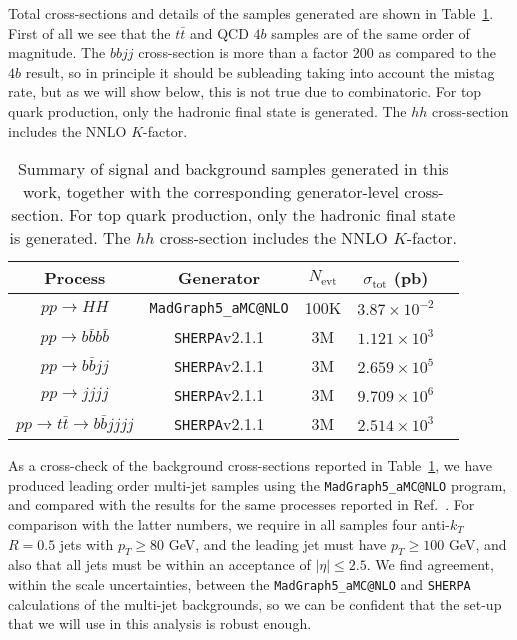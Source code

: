 Total cross-sections and details of the samples generated are shown in Table~\ref{tab:samples}.
%
First of all we see that the $t\bar{t}$ and QCD $4b$ samples are of
the same order of magnitude.
%
The $bbjj$ cross-section is more than a factor 200 as compared to the
$4b$ result, so in principle it should be subleading taking into
account the mistag rate, but as we will show below,
this is not true due to combinatoric.
%
 For top quark production, only the hadronic final state is generated.
The $hh$ cross-section includes the NNLO $K$-factor.


\begin{table}[h]
\begin{center}
\begin{tabular}{|c|c|c|c|c|}
\hline
Process &  Generator & $N_{\mathrm{evt}}$ & $\sigma_{\mathrm{tot}}$ (pb) \\
\hline
\hline
$pp \to HH$ &  {\tt MadGraph5\_aMC@NLO} & 100K & $3.87\times10^{-2}$  \\
\hline
\hline
$pp \to b\bar{b}b\bar{b}$ &  {\tt SHERPA}v2.1.1 & 3M &$1.121 \times10^3$  \\
$pp \to b\bar{b}jj$ &  {\tt SHERPA}v2.1.1 & 3M & $2.659 \times 10^5$  \\
$pp \to jjjj$ &  {\tt SHERPA}v2.1.1 & 3M  & $9.709\times 10^6$  \\
$pp \to t\bar{t}\to b\bar{b}jjjj$ &  {\tt SHERPA}v2.1.1 & 3M & $2.514\times 10^3$ \\
\hline
\end{tabular}
\caption{\small Summary of signal and background samples generated in this work,
  together with the corresponding generator-level cross-section.
  For top quark production, only the hadronic final state is generated.
The $hh$ cross-section includes the NNLO $K$-factor.  
} \label{tab:samples}
\end{center}
\end{table}%

As a cross-check of the background cross-sections reported in Table~\ref{tab:samples}, we have produced leading order
multi-jet samples
using the {\tt MadGraph5\_aMC@NLO} program, and compared with the results for the same processes reported in
Ref.~\cite{Alwall:2014hca}.
%
For comparison with the latter numbers, 
we require in all samples four anti-$k_T$ $R=0.5$ jets with $p_T \ge 80 $ GeV, and the leading jet must have $p_T \ge 100$ GeV, and
also that all jets must be within an acceptance of $|\eta| \le 2.5 $.
%
We find agreement, within the scale uncertainties, between the {\tt MadGraph5\_aMC@NLO} and {\tt SHERPA} calculations of the multi-jet
backgrounds, so we can be confident that the set-up that we will use in this analysis is robust enough.



